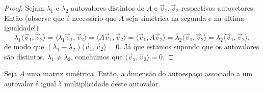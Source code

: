 \begin{proof}
	Sejam $\lambda_1$ e  $\lambda_2$ autovalores distintos de $A$ e $\vec{v}_1, \vec{v}_2$ respectivos autovetores. Então (observe que é necessário que $A$ seja simétrica na segunda e na última igualdade!)
	\begin{equation}
	\lambda_1 \langle \vec{v}_1, \vec{v}_2\rangle = \langle \lambda_1 \vec{v}_1, \vec{v}_2\rangle = \langle A \vec{v}_1, \vec{v}_2\rangle = \langle \vec{v}_1, A \vec{v}_2\rangle = \overline{\lambda}_2 \langle \vec{v}_1, \vec{v}_2\rangle = \lambda_2 \langle \vec{v}_1, \vec{v}_2\rangle,
	\end{equation} de modo que $(\lambda_1 - \lambda_2)\langle \vec{v}_1, \vec{v}_2\rangle = 0$. Já que estamos supondo que os autovalores são distintos, $\lambda_1 \neq \lambda_2$, concluimos que $\langle \vec{v}_1, \vec{v}_2\rangle = 0$.
\end{proof}


\begin{prop}\label{dimens}
	Seja $A$ uma matriz simétrica. Então, a dimensão do autoespaço associado a um autovalor é igual à multiplicidade deste autovalor.
\end{prop}

